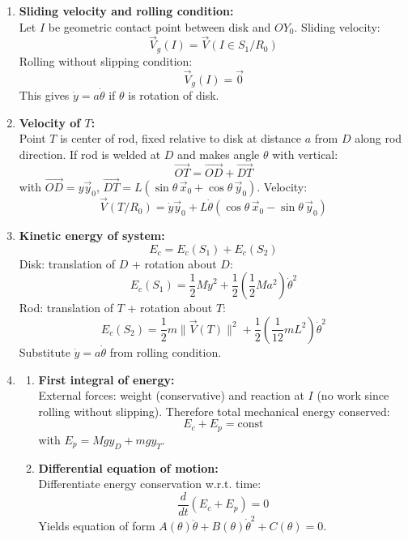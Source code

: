 \documentclass[12pt]{article}
\begin{document}
\begin{answerbox}
\begin{enumerate}
      \item \textbf{Sliding velocity and rolling condition:} \\
      Let \(I\) be geometric contact point between disk and \(OY_0\). Sliding velocity:
      \[
      \vec{V}_g(I) = \vec{V}(I \in S_1 / R_0)
      \]
      Rolling without slipping condition:
      \[
      \vec{V}_g(I) = \vec{0}
      \]
      This gives \( \dot{y} = a \dot{\theta} \) if \(\theta\) is rotation of disk.

      \item \textbf{Velocity of \(T\):} \\
      Point \(T\) is center of rod, fixed relative to disk at distance \(a\) from \(D\) along rod direction. If rod is welded at \(D\) and makes angle \(\theta\) with vertical:
      \[
      \overrightarrow{OT} = \overrightarrow{OD} + \overrightarrow{DT}
      \]
      with \(\overrightarrow{OD} = y \vec{y}_0\), \(\overrightarrow{DT} = L (\sin\theta \, \vec{x}_0 + \cos\theta \, \vec{y}_0)\).
      Velocity:
      \[
      \vec{V}(T/R_0) = \dot{y} \vec{y}_0 + L \dot{\theta} (\cos\theta \, \vec{x}_0 - \sin\theta \, \vec{y}_0)
      \]

      \item \textbf{Kinetic energy of system:} \\
      \[
      E_c = E_c(S_1) + E_c(S_2)
      \]
      Disk: translation of \(D\) + rotation about \(D\):
      \[
      E_c(S_1) = \frac{1}{2} M \dot{y}^2 + \frac{1}{2} \left( \frac{1}{2} M a^2 \right) \dot{\theta}^2
      \]
      Rod: translation of \(T\) + rotation about \(T\):
      \[
      E_c(S_2) = \frac{1}{2} m \| \vec{V}(T) \|^2 + \frac{1}{2} \left( \frac{1}{12} m L^2 \right) \dot{\theta}^2
      \]
      Substitute \(\dot{y} = a \dot{\theta}\) from rolling condition.

      \item 
      \begin{enumerate}
          \item \textbf{First integral of energy:} \\
          External forces: weight (conservative) and reaction at \(I\) (no work since rolling without slipping). Therefore total mechanical energy conserved:
          \[
          E_c + E_p = \text{const}
          \]
          with \(E_p = M g y_D + m g y_T\).

          \item \textbf{Differential equation of motion:} \\
          Differentiate energy conservation w.r.t. time:
          \[
          \frac{d}{dt}(E_c + E_p) = 0
          \]
          Yields equation of form \(A(\theta) \ddot{\theta} + B(\theta) \dot{\theta}^2 + C(\theta) = 0\).


\end{enumerate}
\end{enumerate}
\end{answerbox}
\end{document}
